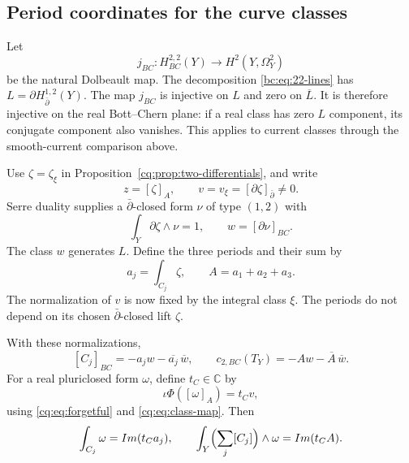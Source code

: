 \subsection{Period coordinates for the curve classes}

Let
\[
 j_{BC}:H_{BC}^{2,2}(Y)\longrightarrow H^2(Y,\Omega_Y^2)
\]
be the natural Dolbeault map.
The decomposition \eqref{bc:eq:22-lines} has
$L=\partial H_{\bar\partial}^{1,2}(Y)$.
The map $j_{BC}$ is injective on $L$ and zero on $\overline L$.
It is therefore injective on the real Bott--Chern plane:
if a real class has zero $L$ component, its conjugate component
also vanishes. This applies to current classes through the
smooth-current comparison above.

Use $\zeta=\zeta_\xi$ in Proposition~\ref{cq:prop:two-differentials},
and write
\[
       z=[\zeta]_A,\qquad v=v_\xi
                     =[\partial\zeta]_{\bar\partial}\ne0.
\]
Serre duality supplies a $\bar\partial$-closed form $\nu$ of
type $(1,2)$ with
\begin{equation}\label{tc:eq:period-normalization}
           \int_Y\partial\zeta\wedge\nu=1,
           \qquad w=[\partial\nu]_{BC}.
\end{equation}
The class $w$ generates $L$.
Define the three periods and their sum by
\begin{equation}\label{tc:eq:curve-periods}
                a_j=\int_{C_j}\zeta,\qquad A=a_1+a_2+a_3.
\end{equation}
The normalization of $v$ is now fixed by the integral class $\xi$.
The periods do not depend on its chosen $\bar\partial$-closed lift $\zeta$.

\begin{proposition}\label{tc:prop:curve-coordinates}
With these normalizations,
\begin{equation}\label{tc:eq:curve-coordinates}
 [C_j]_{BC}=-a_jw-\overline{a_j}\,\overline w,
 \qquad
 c_{2,BC}(T_Y)=-Aw-\overline A\,\overline w.
\end{equation}
For a real pluriclosed form $\omega$, define $t_C\in\mathbb C$ by
\[
           \iota\Phi([\omega]_A)=t_C v,
\]
using \eqref{cq:eq:forgetful} and \eqref{cq:eq:class-map}.
Then
\begin{equation}\label{tc:eq:Courant-area}
           \int_{C_j}\omega=\operatorname{Im}(t_C a_j),\qquad
           \int_Y\Bigl(\sum_j[C_j]\Bigr)\wedge\omega
                            =\operatorname{Im}(t_CA).
\end{equation}
\end{proposition}

